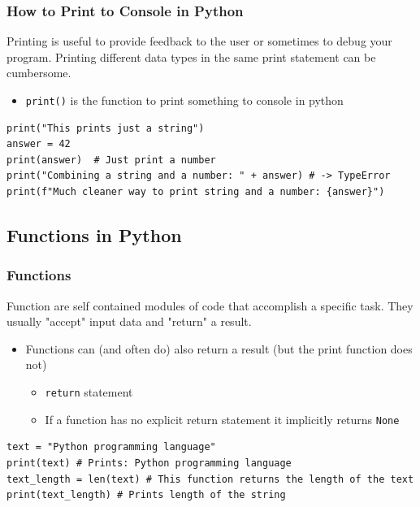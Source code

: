 \documentclass[10pt, a4paper]{beamer} %
\begin{document}
\begin{frame}[c, fragile]\frametitle{How to Print to Console in Python}
  Printing is useful to provide feedback to the user or sometimes to debug your program. Printing different data types
  in the same print statement can be cumbersome.
  \begin{itemize}
    \item \texttt{print()} is the function to print something to console in python
  \end{itemize}

  \begin{lstlisting}
print("This prints just a string")
answer = 42
print(answer)  # Just print a number
print("Combining a string and a number: " + answer) # -> TypeError
print(f"Much cleaner way to print string and a number: {answer}")
\end{lstlisting}


\end{frame}

\subsection{Functions in Python} %
\label{sub:functions}
\begin{frame}
  \frametitle{Functions}
  Function are self contained modules of code that accomplish a specific task. They usually "accept" input data and "return" a result.
  \begin{itemize}
    \begin{lstlisting}
name = "Some name"
print(name) # Some name is used inside the print function -> the print function accepts the input and prints it to the console
    \end{lstlisting}
    \item Functions can (and often do) also return a result (but the print function does not)
          \begin{itemize}
            \item \lstinline!return! statement
            \item If a function has no explicit return statement it implicitly returns \lstinline!None!
          \end{itemize}
  \end{itemize}

  \begin{examples}
    \begin{lstlisting}
text = "Python programming language"
print(text) # Prints: Python programming language
text_length = len(text) # This function returns the length of the text
print(text_length) # Prints length of the string
  \end{lstlisting}
  \end{examples}
\end{frame}
\end{document}
